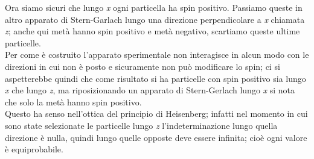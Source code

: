 Ora siamo sicuri che lungo \textit{x} ogni particella ha spin positivo. Passiamo queste in altro apparato di  Stern-Garlach lungo una direzione perpendicolare a \textit{x} chiamata \textit{z}; anche qui metà hanno spin positivo e metà negativo, scartiamo queste ultime particelle.\\
Per come è costruito l'apparato sperimentale non interagisce in alcun modo con le direzioni in cui non è posto e sicuramente non può modificare lo spin; ci si aspetterebbe quindi che come risultato si ha particelle con spin positivo sia lungo \textit{x} che lungo \textit{z}, ma riposizionando un apparato di Stern-Gerlach lungo \textit{x} si nota che solo la metà hanno spin positivo.\\
Questo ha senso nell'ottica del principio di Heisenberg; infatti nel momento in cui sono state selezionate le particelle lungo \textit{z} l'indeterminazione lungo quella direzione è nulla, quindi lungo quelle opposte deve essere infinita; cioè ogni valore è equiprobabile.
